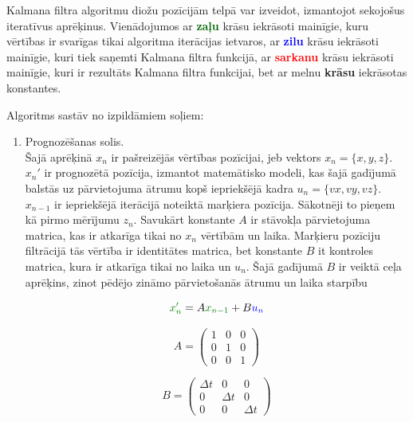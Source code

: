 \documentclass[12pt, a4paper, oneside, openright]{article}
\begin{document}
\par
Kalmana filtra algoritmu \cite{JiangWan1992} diožu pozīcijām telpā var izveidot, izmantojot sekojošus iteratīvus aprēķinus.
Vienādojumos ar \textbf{\textcolor{darkgreen}{zaļu}} krāsu iekrāsoti mainīgie, 
kuru vērtības ir svarīgas tikai algoritma iterācijas ietvaros,
ar \textbf{\textcolor{blue}{zilu}} krāsu iekrāsoti mainīgie, kuri tiek saņemti Kalmana filtra funkcijā, 
ar \textbf{\textcolor{red}{sarkanu}} krāsu iekrāsoti mainīgie, kuri ir rezultāts Kalmana filtra funkcijai, 
bet ar melnu \textbf{krāsu} iekrāsotas konstantes.
\par
Algoritms sastāv no izpildāmiem soļiem:
\begin{enumerate}

\item Prognozēšanas solis. \\
Šajā aprēķinā $x_n$ ir pašreizējās vērtības pozīcijai, jeb vektors $x_n = \{x, y, z\}$. $x_n'$ ir prognozētā
pozīcija, izmantot matemātisko modeli, kas šajā gadījumā balstās uz pārvietojuma ātrumu kopš iepriekšējā kadra
$u_n = \{vx, vy, vz\}$. $x_{n-1}$ ir iepriekšējā iterācijā noteiktā marķiera pozīcija. Sākotnēji
to pieņem kā pirmo mērījumu $z_n$. Savukārt konstante $A$ ir stāvokļa pārvietojuma matrica, kas ir atkarīga
tikai no $x_n$ vērtībām un laika. Marķieru pozīciju filtrācijā tās vērtība ir identitātes matrica,
bet konstante $B$ it kontroles matrica, kura ir atkarīga tikai no laika un $u_n$. Šajā gadījumā $B$ ir
veiktā ceļa aprēķins, zinot pēdējo zināmo pārvietošanās ātrumu un laika starpību
 
\begin{equation}\label{eq:k_1}
\textcolor{darkgreen}{x_{n}'} = A \textcolor{darkgreen}{x_{n-1}}+ B \textcolor{blue}{u_{n}}
\end{equation}

\begin{equation}\label{eq:k_2}
A =  \begin{pmatrix}
1 & 0 & 0\\
0 & 1 & 0\\
0 & 0 & 1
\end{pmatrix}
\end{equation}

\begin{equation}
B = \begin{pmatrix}
\Delta t & 0 & 0\\
0 & \Delta t & 0\\
0 & 0 & \Delta t
\end{pmatrix} 
\end{equation}


\end{enumerate}
\end{document}
